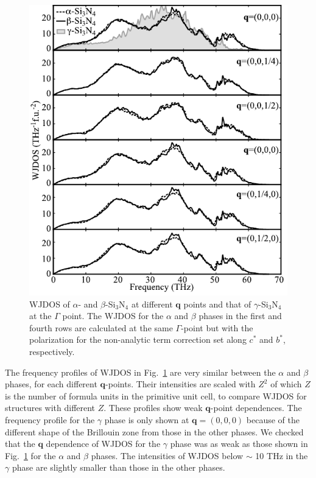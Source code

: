 \documentclass[twocolumn,amsmath,amssymb,a4paper,prb,superscriptaddress,floatfix]{revtex4-1}
\begin{document}
\begin{figure}[ht]
 \centering
  \includegraphics[width=0.9\linewidth]{figure_wjdoss_gray.pdf} \caption{
          WJDOS of $\alpha$- and $\beta$-Si$_3$N$_4$ at different $\mathbf
          q$ points and that of $\gamma$-Si$_3$N$_4$ at the $\Gamma$ point.
  The WJDOS for the $\alpha$ and $\beta$ phases in the  first and fourth rows
  are calculated at the same $\Gamma$-point but
  with the polarization for the non-analytic term correction set along $c^*$ and
  $b^*$, respectively. \label{fig:Fig6_338} }
 \centering
\end{figure}

The frequency profiles of WJDOS in Fig.~\ref{fig:Fig6_338} are very similar between the $\alpha$ and
$\beta$ phases, for each different $\mathbf{q}$-points.  Their intensities are
scaled with $Z^2$ of which $Z$ is the number of formula units in the primitive
unit cell, to compare WJDOS for structures with different $Z$.  These profiles
show weak $\mathbf{q}$-point dependences.  The frequency profile for the
$\gamma$ phase is only shown at $\mathbf{q}=(0,0,0)$ because of the different
shape of the Brillouin zone from those in the other phases.  We checked that
the $\mathbf{q}$ dependence of WJDOS for the $\gamma$ phase was as weak as
those shown in Fig.~\ref{fig:Fig6_338} for the $\alpha$ and $\beta$ phases.
The intensities of WJDOS below $\sim$ 10 THz in the $\gamma$ phase are slightly smaller than those in
the other phases.
\end{document}
